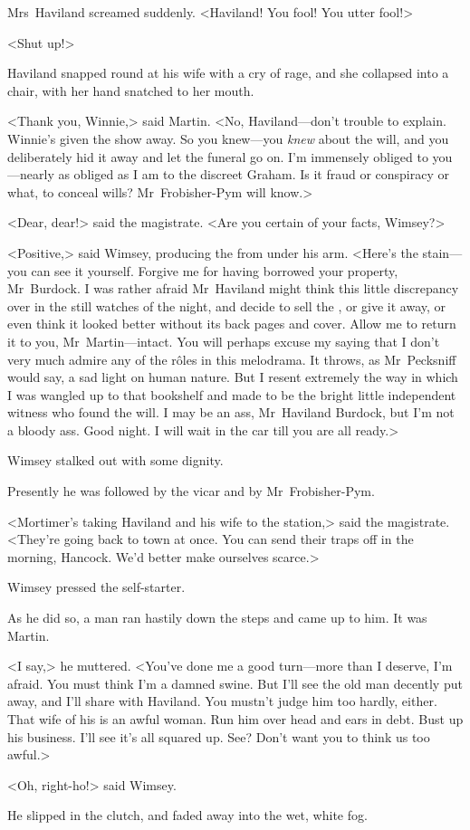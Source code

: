 Mrs~Haviland screamed suddenly. <Haviland! You fool! You utter fool!>

<Shut up!>

Haviland snapped round at his wife with a cry of rage, and she collapsed into a chair, with her hand snatched to her mouth.

<Thank you, Winnie,> said Martin. <No, Haviland—don't trouble to explain. Winnie's given the show away. So you knew—you \emph{knew} about the will, and you deliberately hid it away and let the funeral go on. I'm immensely obliged to you—nearly as obliged as I am to the discreet Graham. Is it fraud or conspiracy or what, to conceal wills? Mr~Frobisher-Pym will know.>

<Dear, dear!> said the magistrate. <Are you certain of your facts, Wimsey?>

<Positive,> said Wimsey, producing the  from under his arm. <Here's the stain—you can see it yourself. Forgive me for having borrowed your property, Mr~Burdock. I was rather afraid Mr~Haviland might think this little discrepancy over in the still watches of the night, and decide to sell the , or give it away, or even think it looked better without its back pages and cover. Allow me to return it to you, Mr~Martin—intact. You will perhaps excuse my saying that I don't very much admire any of the rôles in this melodrama. It throws, as Mr~Pecksniff would say, a sad light on human nature. But I resent extremely the way in which I was wangled up to that bookshelf and made to be the bright little independent witness who found the will. I may be an ass, Mr~Haviland Burdock, but I'm not a bloody ass. Good night. I will wait in the car till you are all ready.>

Wimsey stalked out with some dignity.

Presently he was followed by the vicar and by Mr~Frobisher-Pym.

<Mortimer's taking Haviland and his wife to the station,> said the magistrate. <They're going back to town at once. You can send their traps off in the morning, Hancock. We'd better make ourselves scarce.>

Wimsey pressed the self-starter.

As he did so, a man ran hastily down the steps and came up to him. It was Martin.

<I say,> he muttered. <You've done me a good turn—more than I deserve, I'm afraid. You must think I'm a damned swine. But I'll see the old man decently put away, and I'll share with Haviland. You mustn't judge him too hardly, either. That wife of his is an awful woman. Run him over head and ears in debt. Bust up his business. I'll see it's all squared up. See? Don't want you to think us too awful.>

<Oh, right-ho!> said Wimsey.

He slipped in the clutch, and faded away into the wet, white fog.